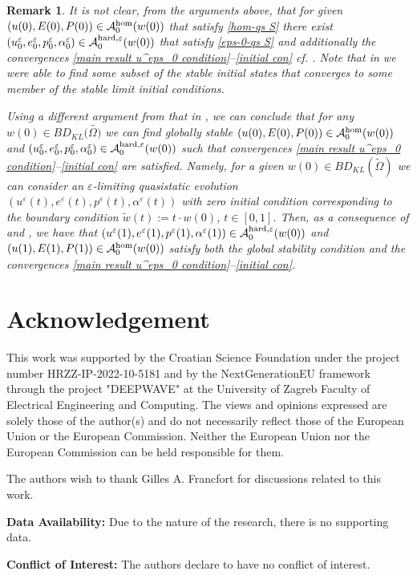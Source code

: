 \documentclass[reqno,10pt]{amsart}
\numberwithin{equation}{section}
\newtheorem{remark}[theorem]{Remark}
\theoremstyle{remark}
\newcommand{\calA}{\mathcal{A}}
\newcommand{\eps}{\varepsilon}
\newcommand{\ext}[1]{\widetilde{#1}}
\begin{document}
\begin{remark}
It is not clear, from the arguments above, that for given $(u(0), E(0), P(0)) \in \calA^{\rm hom}_{0}(w(0))$ that satisfy \ref{hom-qs S} there exist $(u^\eps_0, e^\eps_0, p^\eps_0, \alpha^\eps_0) \in \calA_{0}^{\rm hard,\eps}(w(0))$ that satisfy \ref{eps-0-qs S} and additionally the convergences \eqref{main result u^eps_0 condition}--\eqref{initial con} cf. . Note that in  we were able to find some subset of the stable initial states that converges to some member of the stable limit initial conditions.

Using a different argument from that in , we can conclude that for any $w(0) \in BD_{KL}(\widetilde{\Omega)}$ we can find globally stable $(u(0), E(0), P(0)) \in \calA^{\rm hom}_{0}(w(0))$ and $(u^\eps_0, e^\eps_0, p^\eps_0, \alpha^\eps_0) \in \calA_{0}^{\rm hard,\eps}(w(0))$ such that convergences \eqref{main result u^eps_0 condition}--\eqref{initial con} are satisfied.
Namely, for a given $w(0) \in BD_{KL}(\ext{\Omega})$ we can consider an $\eps$-limiting quasistatic evolution $(u^\eps(t), e^\eps(t), p^\eps(t), \alpha^\eps(t))$ with zero initial condition corresponding to the boundary condition $\tilde{w}(t) := t \cdot w(0)$, $t \in [0,1]$.
Then, as a consequence of  and , we have that $(u^\eps(1), e^\eps(1), p^\eps(1), \alpha^\eps(1)) \in \calA^{\rm hard,\eps}_0 (w(0))$ and $(u(1),E(1),P(1)) \in \calA^{\rm hom}_{0}(w(0))$ satisfy both the global stability condition and the convergences \eqref{main result u^eps_0 condition}--\eqref{initial con}. 
\end{remark}

\section*{Acknowledgement}

This work was supported by the Croatian Science Foundation under the project number HRZZ-IP-2022-10-5181 and by the NextGenerationEU framework through the project "DEEPWAVE" at the University of Zagreb Faculty of Electrical Engineering and Computing. 
The views and opinions expressed are solely those of the author(s) and do not necessarily reflect those of the European Union or the European Commission. Neither the European Union nor the European Commission can be held responsible for them.

The authors wish to thank Gilles A. Francfort for discussions related to this work.

\vspace{+1ex} 
\noindent \textbf{Data Availability:} Due to the nature of the research, there is no supporting data.

\vspace{+1ex} 
\noindent \textbf{Conflict of Interest:} The authors declare to have no conflict of interest.

\printbibliography
\end{document}
